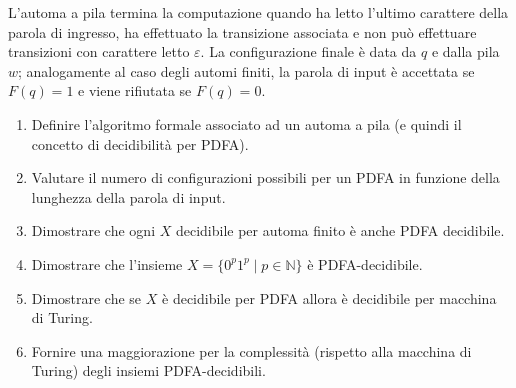 \begin{ex}
L'automa a pila termina la computazione quando ha letto l'ultimo carattere della parola di ingresso, ha effettuato la transizione associata e non può effettuare transizioni con carattere letto $\varepsilon$. La configurazione finale è data da $q$ e dalla pila $w$; analogamente al caso degli automi finiti, la parola di input è accettata se $F(q)=1$ e viene rifiutata se $F(q)=0$.
\renewcommand{\labelenumi}{\alph{enumi})}
\ 
\begin{enumerate}
\item Definire l'algoritmo formale associato ad un automa a pila (e quindi il concetto di decidibilità per PDFA).
\item Valutare il numero di configurazioni possibili per un PDFA in funzione della lunghezza della parola di input.
\item Dimostrare che ogni $X$ decidibile per automa finito è anche PDFA decidibile.
\item Dimostrare che l'insieme $X=\{0^p1^p\mid p\in\mathbb N\}$ è PDFA-decidibile.
\item Dimostrare che se $X$ è decidibile per PDFA allora è decidibile per macchina di Turing.
\item Fornire una maggiorazione per la complessità (rispetto alla macchina di Turing) degli insiemi PDFA-decidibili.
\end{enumerate}
\end{ex}

